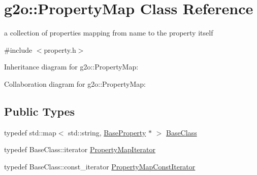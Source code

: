 \hypertarget{classg2o_1_1PropertyMap}{}\section{g2o\+:\+:Property\+Map Class Reference}
\label{classg2o_1_1PropertyMap}


a collection of properties mapping from name to the property itself  




{\ttfamily \#include $<$property.\+h$>$}



Inheritance diagram for g2o\+:\+:Property\+Map\+:


Collaboration diagram for g2o\+:\+:Property\+Map\+:
\subsection*{Public Types}
\begin{DoxyCompactItemize}
\item 
typedef std\+::map$<$ std\+::string, \hyperlink{classg2o_1_1BaseProperty}{Base\+Property} $\ast$ $>$ \hyperlink{classg2o_1_1PropertyMap_ac57ddbe51d16070e697fe314889fee03}{Base\+Class}
\item 
typedef Base\+Class\+::iterator \hyperlink{classg2o_1_1PropertyMap_af5dd0defe4a5096f0d5602b38e837a78}{Property\+Map\+Iterator}
\item 
typedef Base\+Class\+::const\+\_\+iterator \hyperlink{classg2o_1_1PropertyMap_af09ea140ab099b1762e9634b7fdcaf52}{Property\+Map\+Const\+Iterator}
\end{DoxyCompactItemize}
